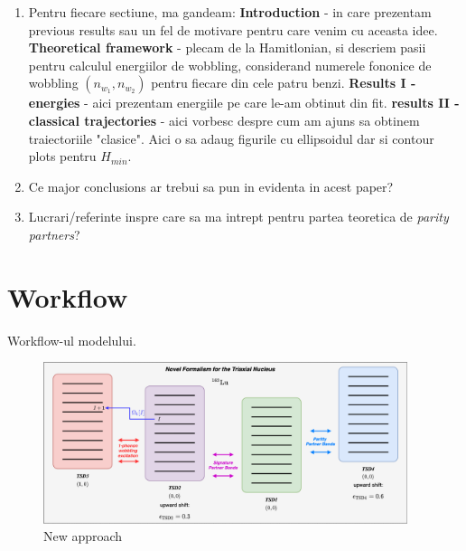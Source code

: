\documentclass[%
 preprint,
 amsmath,
 amssymb,
 aps,
]{revtex4-2}
\begin{document}
\begin{enumerate}
    \item Pentru fiecare sectiune, ma gandeam: \textbf{Introduction} - in care prezentam previous results sau un fel de motivare pentru care venim cu aceasta idee. \textbf{Theoretical framework} - plecam de la Hamitlonian, si descriem pasii pentru calculul energiilor de wobbling, considerand numerele fononice de wobbling $(n_{w_1},n_{w_2})$ pentru fiecare din cele patru benzi. \textbf{Results I - energies} - aici prezentam energiile pe care le-am obtinut din fit. \textbf{results II - classical trajectories} - aici vorbesc despre cum am ajuns sa obtinem traiectoriile "clasice". Aici o sa adaug figurile cu ellipsoidul dar si contour plots pentru $H_{min}$. 
    \item Ce major conclusions ar trebui sa pun in evidenta in acest paper?
    \item Lucrari/referinte inspre care sa ma intrept pentru partea teoretica de \textit{parity partners}?
\end{enumerate}

\section{Workflow}

Workflow-ul modelului.

\begin{figure}[h]
    \centering
    \includegraphics[width=0.95\textwidth]{images/diagrams/double_shift_fit_workflow.png}
    \caption{New approach}
    \label{fig:band-structure}
\end{figure}
\end{document}
